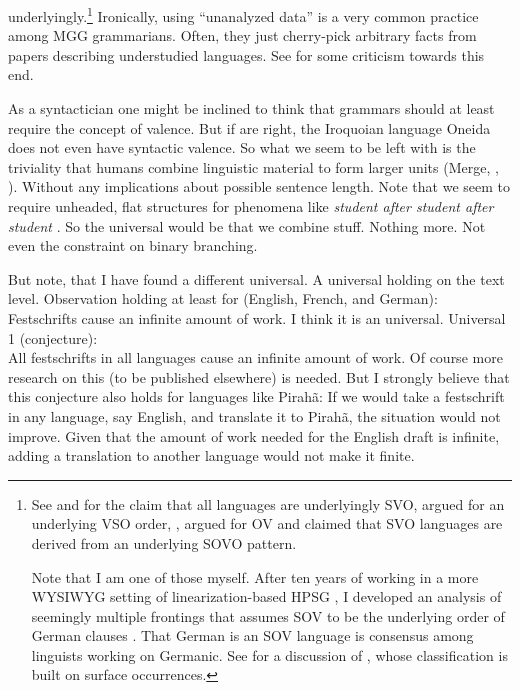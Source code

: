 \documentclass[output=paper,colorlinks,citecolor=brown]{langscibook}
\begin{document}
underlyingly.\footnote{
See  and  for the claim that all languages are
underlyingly SVO,
\citet{McCawley70a-u} argued for an underlying VSO order, \citet[]{Bach71a-u}, \citet{Ross73a-u} argued for OV and
 claimed that SVO languages are derived from an
underlying SOVO pattern.

Note that I am one of those myself. After ten years of working in a more WYSIWYG setting of
linearization-based HPSG \citep{Mueller2004b}, I developed an analysis of seemingly multiple frontings that assumes SOV
to be the underlying order of German clauses \parencites{Mueller2005c,Mueller2005d,MuellerGS}. That
German is an SOV language is consensus among linguists working on Germanic. See
 for a discussion of , whose classification is built on
surface occurrences.
}
Ironically, using ``unanalyzed data'' is a very common practice among MGG
grammarians. Often, they just cherry-pick arbitrary facts from papers describing understudied
languages. See  for some criticism towards this end.
 
As a syntactician one might be inclined to think that grammars should at least require the concept of valence. But
if \citet{KM2012a} are right, the Iroquoian language Oneida does not even have syntactic valence. So
what we seem to be left with is the triviality that humans combine linguistic material to form
larger units (Merge, \citealp{HCF2002a}, \citealp[]{MuellerCoreGram}). Without any implications about possible sentence length. Note that we seem to
require unheaded, flat structures for phenomena like \emph{student after student after student} \parencites{Matsuyama2004a}{Jackendoff2008a}{Bargmann2015a}[Section~4.1]{MuellerCxG}. So
the universal would be that we combine stuff. Nothing more. Not even the constraint on binary branching.

But note, that I have found a different universal. A universal holding on the text level. 
\ea
Observation holding at least for (English, French, and German):\\
Festschrifts cause an infinite amount of work.
\z
I think it is an universal.
\ea
Universal 1 (conjecture):\\
All festschrifts in all languages cause an infinite amount of work.
\z
Of course more research on this (to be published elsewhere) is needed. But I strongly believe that
this conjecture also holds for languages like Pirahã: If we would take a festschrift in
any language, say English, and translate it to Pirahã, the situation would not improve. Given that
the amount of work needed for the English draft is infinite, adding a translation to another
language would not make it finite. 
\end{document}
